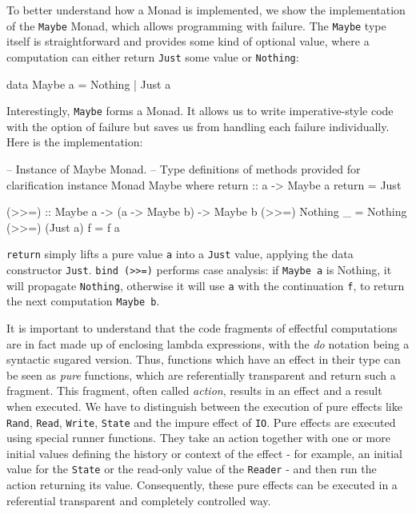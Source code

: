 To better understand how a Monad is implemented, we show the implementation of the \texttt{Maybe} Monad, which allows programming with failure. The \texttt{Maybe} type itself is straightforward and provides some kind of optional value, where a computation can either return \texttt{Just} some value or \texttt{Nothing}:

\begin{HaskellCode}
data Maybe a = Nothing | Just a
\end{HaskellCode}

Interestingly, \texttt{Maybe} forms a Monad. It allows us to write imperative-style code with the option of failure but saves us from handling each failure individually. Here is the implementation:

\begin{HaskellCode}
-- Instance of Maybe Monad.
-- Type definitions of methods provided for clarification
instance Monad Maybe where
  return :: a -> Maybe a
  return = Just
  
  (>>=) :: Maybe a -> (a -> Maybe b) -> Maybe b
  (>>=) Nothing _  = Nothing
  (>>=) (Just a) f = f a 
\end{HaskellCode}

\texttt{return} simply lifts a pure value \texttt{a} into a \texttt{Just} value, applying the data constructor \texttt{Just}. \texttt{bind (>>=)} performs case analysis: if \texttt{Maybe a} is Nothing, it will propagate \texttt{Nothing}, otherwise it will use \texttt{a} with the continuation \texttt{f}, to return the next computation \texttt{Maybe b}.

\medskip

It is important to understand that the code fragments of effectful computations are in fact  made up of enclosing lambda expressions, with the \textit{do} notation being a syntactic sugared version. Thus, functions which have an effect in their type can be seen as \textit{pure} functions, which are referentially transparent and return such a fragment. This fragment, often called \textit{action}, results in an effect and a result when executed. We have to distinguish between the execution of pure effects like \texttt{Rand}, \texttt{Read}, \texttt{Write}, \texttt{State} and the impure effect of \texttt{IO}. Pure effects are executed using special runner functions. They take an action together with one or more initial values defining the history or context of the effect - for example, an initial value for the \texttt{State} or the read-only value of the \texttt{Reader} - and then run the action returning its value. Consequently, these pure effects can be executed in a referential transparent and completely controlled way.

